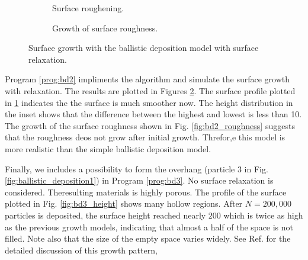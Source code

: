 \begin{figure}
	\centering
	\begin{subfigure}{0.45\textwidth}
		\centering
		\caption{Surface roughening.}
		\label{fig:bd2_height}
	\end{subfigure}
	\begin{subfigure}{0.45\textwidth}
		\centering
		\caption{Growth of surface roughness.}
	\end{subfigure}
	\caption{Surface growth with the ballistic deposition model with surface relaxation.}\label{fig:bd2}
\end{figure}

Program \ref{prog:bd2} impliments the algorithm and simulate the surface growth with relaxation.   The results are plotted in Figures \ref{fig:bd2}.  The surface profile plotted in \ref{fig:bd2_height} indicates the the surface is much smoother now. The height distribution in the inset shows that the difference between the highest and lowest is less than 10.  The growth of the surface roughness shown in Fig. \ref{fig:bd2_roughness} suggests that the roughness deos not grow after initial growth.  Threfor,e this model is more realistic than the simple ballistic deposition model.

Finally, we includes a possibility to form the overhang (particle 3 in Fig. \ref{fig:ballistic_deposition1}) in Program \ref{prog:bd3}.  
No surface relaxation is considered.  Theresulting materials is highly porous. The profile of the surface plotted in Fig. \ref{fig:bd3_height} shows many hollow regions. After $N=200,000$ particles is deposited, the surface height reached nearly $200$ which is twice as high as the previous growth models, indicating that almost a half of the space is not filled.  Note also that  the size of the empty space varies widely.  See Ref. \cite{ballistic_growth} for the detailed discussion of this growth pattern, 

